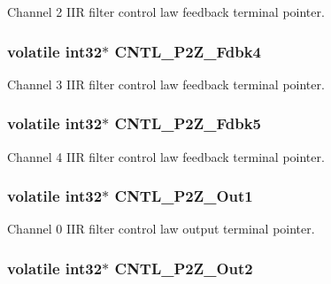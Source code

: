 Channel 2 I\-I\-R filter control law feedback terminal pointer. \hypertarget{a00010_a6937e965f3ae840ea6ee43cce410680f}{
\subsubsection[{C\-N\-T\-L\-\_\-2\-P2\-Z\-\_\-\-Fdbk4}]{\setlength{\rightskip}{0pt plus 5cm}volatile int32$\ast$ C\-N\-T\-L\-\_\-P2\-Z\-\_\-\-Fdbk4}}\label{a00010_a6937e965f3ae840ea6ee43cce410680f}
Channel 3 I\-I\-R filter control law feedback terminal pointer. \hypertarget{a00010_af5cbb635f31bbebd041e8543deb40dee}{
\subsubsection[{C\-N\-T\-L\-\_\-2\-P2\-Z\-\_\-\-Fdbk5}]{\setlength{\rightskip}{0pt plus 5cm}volatile int32$\ast$ C\-N\-T\-L\-\_\-P2\-Z\-\_\-\-Fdbk5}}\label{a00010_af5cbb635f31bbebd041e8543deb40dee}
Channel 4 I\-I\-R filter control law feedback terminal pointer. \hypertarget{a00010_a84d7c096ca668d1edc5e4fa54abe5d98}{
\subsubsection[{C\-N\-T\-L\-\_\-2\-P2\-Z\-\_\-\-Out1}]{\setlength{\rightskip}{0pt plus 5cm}volatile int32$\ast$ C\-N\-T\-L\-\_\-P2\-Z\-\_\-\-Out1}}\label{a00010_a84d7c096ca668d1edc5e4fa54abe5d98}
Channel 0 I\-I\-R filter control law output terminal pointer. \hypertarget{a00010_ae6679b66ffeca93742f973a2c947855f}{
\subsubsection[{C\-N\-T\-L\-\_\-2\-P2\-Z\-\_\-\-Out2}]{\setlength{\rightskip}{0pt plus 5cm}volatile int32$\ast$ C\-N\-T\-L\-\_\-P2\-Z\-\_\-\-Out2}}\label{a00010_ae6679b66ffeca93742f973a2c947855f}
